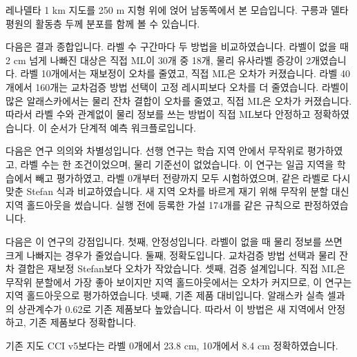 

레나델타 1 km 지도를 250 m 지형 위에 얹어 남동쪽에서 본 모습입니다. 구릉과 델타 평원의 활동층 두께 분포를 함께 볼 수 있습니다.



다음은 결과 종합입니다. 라벨 수 구간마다 두 방법을 비교하였습니다. 라벨이 없을 때 2 cm 넘게 나빠진 대상은 직접 ML이 30개 중 18개, 물리 유사라벨 증강이 2개였습니다. 라벨 10개에서는 재보정이 오차를 줄였고, 직접 ML은 오차가 커졌습니다. 라벨 40개에서 160개는 교차검증 방법 선택이 고정 레시피보다 오차를 더 줄였습니다. 라벨이 많은 알래스카에서는 물리 잔차 결합이 오차를 줄였고, 직접 ML은 오차가 커졌습니다. 따라서 라벨 수와 관계없이 물리 정보를 쓰는 방법이 직접 ML보다 안정하고 정확하였습니다. 이 순서가 단계적 예측 워크플로입니다.



다음은 연구 의의와 차별성입니다. 선행 연구는 학습 지역 안에서 무작위로 평가하였고, 라벨 수는 한 조건이었으며, 물리 기준선이 없었습니다. 이 연구는 일곱 지역을 학습에서 빼고 평가하였고, 라벨 0개부터 전량까지 모두 시험하였으며, 같은 라벨로 다시 맞춘 Stefan 식과 비교하였습니다. 새 지역 오차를 바르게 재기 위해 무작위 분할 대신 지역 홀드아웃을 썼습니다. 실행 전에 등록한 가설 174개를 같은 규칙으로 판정하였습니다.



다음은 이 연구의 강점입니다. 첫째, 안정성입니다. 라벨이 없을 때 물리 정보를 쓰면 크게 나빠지는 경우가 줄었습니다. 둘째, 정확도입니다. 교차검증 방법 선택과 물리 잔차 결합은 재보정 Stefan보다 오차가 작았습니다. 셋째, 검증 설계입니다. 직접 ML은 무작위 분할에서 가장 좋아 보이지만 지역 홀드아웃에서는 오차가 커지므로, 이 연구는 지역 홀드아웃으로 평가하였습니다. 넷째, 기존 제품 대비입니다. 알래스카 실측 셀과의 상관계수가 0.62로 기존 제품보다 높았습니다. 따라서 이 방법은 새 지역에서 안정하고, 기존 제품보다 정확합니다.


\begin{optbox}
기존 지도 CCI v5보다는 라벨 0개에서 23.8 cm, 10개에서 8.4 cm 정확하였습니다.
\end{optbox}

